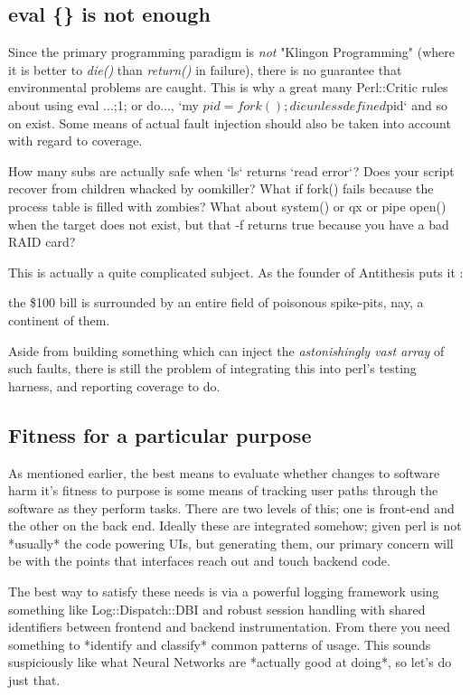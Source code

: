 \documentclass{article}
\begin{document}
\subsection{eval \{\} is not enough}

Since the primary programming paradigm is \textit{not} "Klingon Programming" (where it is better to \textit{die()} than \textit{return()} in failure), there is no guarantee that environmental problems are caught.
This is why a great many Perl::Critic rules about using eval {...;1;} or do..., `my $pid=fork(); die unless defined $pid` and so on exist.
Some means of actual fault injection should also be taken into account with regard to coverage.

How many subs are actually safe when `ls` returns `read error`?
Does your script recover from children whacked by oomkiller?
What if fork() fails because the process table is filled with zombies?
What about system() or qx{} or pipe open() when the target does not exist, but that -f returns true because you have a bad RAID card?

This is actually a quite complicated subject.  As the founder of Antithesis puts it \cite{antithesis}:
\begin{displayquote}
the \$100 bill is surrounded by an entire field of poisonous spike-pits, nay, a continent of them.
\end{displayquote}
Aside from building something which can inject the \textit{astonishingly vast array} of such faults, there is still the problem of integrating this into perl's testing harness, and reporting coverage to do.

\subsection{Fitness for a particular purpose}

As mentioned earlier, the best means to evaluate whether changes to software harm it's fitness to purpose is some means of tracking user paths through the software as they perform tasks.
There are two levels of this; one is front-end and the other on the back end.
Ideally these are integrated somehow; given perl is not *usually* the code powering UIs, but generating them, our primary concern will be with the points that interfaces reach out and touch backend code.

The best way to satisfy these needs is via a powerful logging framework using something like Log::Dispatch::DBI and robust session handling with shared identifiers between frontend and backend instrumentation.
From there you need something to *identify and classify* common patterns of usage.
This sounds suspiciously like what Neural Networks are *actually good at doing*, so let's do just that.
\end{document}
